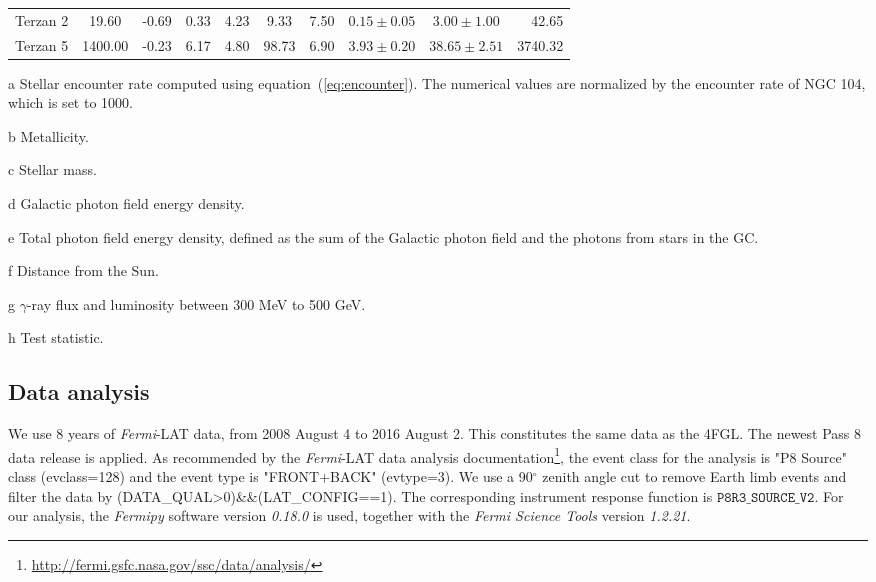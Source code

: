 \documentclass[doublespace,draft,nopageskip]{VTthesis} %
\begin{document}
\begin{table}
\begin{threeparttable}
\begin{tabular}{lccccccccr}
Terzan 2 & 19.60 & -0.69 & 0.33 & 4.23 & 9.33 & 7.50 & $0.15 \pm 0.05$ & $3.00 \pm 1.00$ & 42.65\\
Terzan 5 & 1400.00 & -0.23 & 6.17 & 4.80 & 98.73 & 6.90 & $3.93 \pm 0.20$ & $38.65 \pm 2.51$ & 3740.32\\
\hline
\end{tabular}
\begin{tablenotes}
\item [a] Stellar encounter rate computed using equation~(\ref{eq:encounter}).
The numerical values are normalized by the encounter rate of NGC 104, which is set to 1000.
\item [b] Metallicity.
\item [c] Stellar mass.
\item [d] Galactic photon field energy density.
\item [e] Total photon field energy density, defined as the sum of the Galactic photon field and the photons from stars in the GC.
\item [f] Distance from the Sun.
\item [g] $\gamma$-ray flux and luminosity between 300 MeV to 500 GeV.
\item [h] Test statistic.
\end{tablenotes}
\end{threeparttable}
\end{table}

\subsection{Data analysis}\label{sec:data}

We use 8 years of \textit{Fermi}-LAT data, from 2008 August 4 to 2016 August 2. This constitutes the same data as the 4FGL. The newest Pass 8 data release is applied. As recommended by the \textit{Fermi}-LAT data analysis documentation\footnote{\url{http://fermi.gsfc.nasa.gov/ssc/data/analysis/}}, the event class for the analysis is "P8 Source" class (evclass=128) and the event type is "FRONT+BACK" (evtype=3). We use a 90$^{\circ}$ zenith angle cut to remove Earth limb events and filter the data by (DATA\_QUAL>0)\&\&(LAT\_CONFIG==1). The corresponding instrument response function is $\texttt{P8R3\_SOURCE\_V2}$. For our analysis, the \textit{Fermipy} software version \textit{0.18.0} is used, together with the \textit{Fermi Science Tools} version \textit{1.2.21}.
\end{document}
